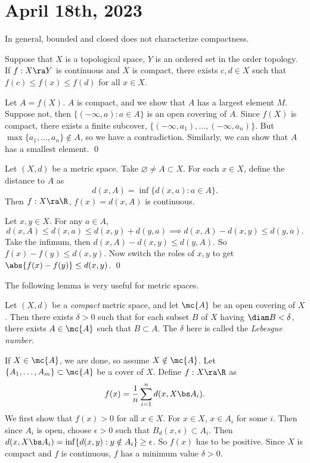 \section*{April 18th, 2023}

In general, bounded and closed does not characterize compactness.

  Suppose that \(X\) is a topological space, \(Y\) is an ordered set in the order topology. If \(f : X \ra Y\) is continuous and \(X\) is compact, there exists \(c, d \in X\) such that \(f(c) \leq f(x) \leq f(d)\) for all \(x \in X\).

\pf Let \(A = f(X)\). \(A\) is compact, and we show that \(A\) has a largest element \(M\). Suppose not, then \(\{(-\infty, a) : a \in A\}\) is an open covering of \(A\). Since \(f(X)\) is compact, there exists a finite subcover, \(\{(-\infty, a_1), \dots, (-\infty, a_n)\}\). But \(\max\{a_1, \dots, a_n\} \notin A\), so we have a contradiction. Similarly, we can show that \(A\) has a smallest element. \qed

\rmk Let \((X, d)\) be a metric space. Take \(\varnothing \neq A \subset X\). For each \(x \in X\), define the distance to \(A\) as
\[
    d(x, A) = \inf \{d(x, a) : a \in A\}.
\]
Then \(f: X \ra \R\), \(f(x) = d(x, A)\) is continuous.

\pf Let \(x, y \in X\). For any \(a \in A\),
\[
    d(x, A) \leq d(x, a) \leq d(x, y) + d(y, a) \implies d(x, A) - d(x, y) \leq d(y, a).
\]
Take the infimum, then \(d(x, A) - d(x, y) \leq d(y, A)\). So \(f(x) - f(y) \leq d(x, y)\). Now switch the roles of \(x, y\) to get \(\abs{f(x) - f(y)} \leq d(x, y)\). \qed

The following lemma is very useful for metric spaces.

  Let \((X, d)\) be a \textit{compact} metric space, and let \(\mc{A}\) be an open covering of \(X\). Then there exists \(\delta > 0\) such that for each subset \(B\) of \(X\) having \(\diam B < \delta\), there exists \(A \in \mc{A}\) such that \(B \subset A\). The \(\delta\) here is called the \textit{Lebesgue number}.

\pf If \(X \in \mc{A}\), we are done, so assume \(X \notin \mc{A}\). Let \(\{A_1, \dots, A_m\} \subset \mc{A}\) be a cover of \(X\). Define \(f : X \ra \R\) as
\[
    f(x) = \frac{1}{n}\sum_{i=1}^n d(x, X \bs A_i).
\]
We first show that \(f(x) > 0\) for all \(x \in X\). For \(x \in X\), \(x \in A_i\) for some \(i\). Then since \(A_i\) is open, choose \(\epsilon > 0\) such that \(B_d(x, \epsilon) \subset A_i\). Then \(d(x, X \bs A_i) = \inf\{d(x, y) : y \notin A_i\} \geq \epsilon\). So \(f(x)\) has to be positive. Since \(X\) is compact and \(f\) is continuous, \(f\) has a minimum value \(\delta > 0\).

